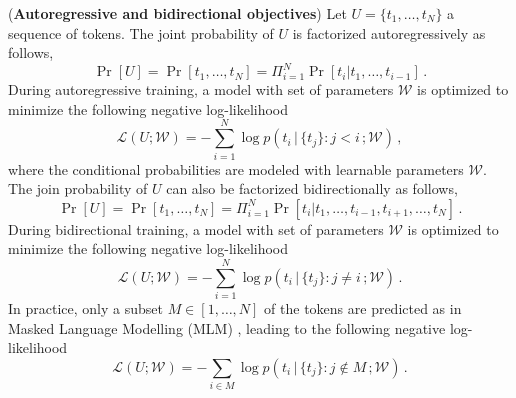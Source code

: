 \begin{definition}
\label{def-objective-functions}
%
(\textbf{Autoregressive and bidirectional objectives})
%
Let $U = \{t_1, \dots, t_N\}$ a sequence of tokens.
%
The joint probability of $U$ is factorized autoregressively as follows,
%
\begin{equation}
    \Pr[U] = \Pr[t_1,\dots,t_N] = \Pi_{i=1}^N \Pr[t_i|t_1,\dots,t_{i-1}]\,.
\end{equation}
%
During autoregressive training, a model with set of parameters $\mathcal{W}$ is optimized to minimize the following negative log-likelihood
%
\begin{equation}
\mathcal{L}(U; \mathcal{W}) = - \sum_{i=1}^{N} \log p(t_i \,|\, \{t_j\} : j < i\,; \mathcal{W})\,,
\end{equation}
%
where the conditional probabilities are modeled with learnable parameters $\mathcal{W}$.
%
The join probability of $U$ can also be factorized bidirectionally as follows,
%
\begin{equation}
    \Pr[U] = \Pr[t_1,\dots,t_N] = \Pi_{i=1}^N \Pr[t_i|t_1,\dots,t_{i-1}, t_{i+1}, \dots, t_N]\,.
\end{equation}
%
During bidirectional training, a model with set of parameters $\mathcal{W}$ is optimized to minimize the following negative log-likelihood
%
\begin{equation}
\mathcal{L}(U; \mathcal{W}) = - \sum_{i=1}^{N} \log p(t_i \,|\, \{t_j\} : j \neq i\,; \mathcal{W})\,.
\end{equation}
%
In practice, only a subset $M\in [1,\dots,N]$ of the tokens are predicted as in  Masked Language Modelling (MLM) \citep[see ][]{devlinBERTPretrainingDeep2019,warnerSmarterBetterFaster2024}, leading to the following negative log-likelihood
%
\begin{equation}
\mathcal{L}(U; \mathcal{W}) = - \sum_{i\in M} \log p(t_i \,|\, \{t_j\} : j \notin M\,; \mathcal{W})\,.
\end{equation}
%
\end{definition}